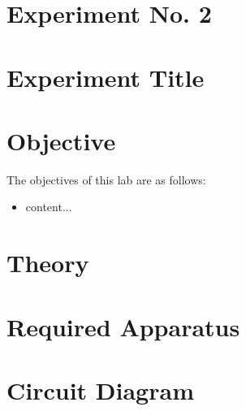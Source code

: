 \documentclass[a4paper,12pt]{article}
\begin{document}
	
	
\section{Experiment No. 2}

\section{Experiment Title }
\section{Objective}

The objectives of this lab are as follows:
\begin{itemize}
\item 	content...
\end{itemize}
\section{Theory}
\section{Required Apparatus}
\section{Circuit Diagram}
\end{document}

